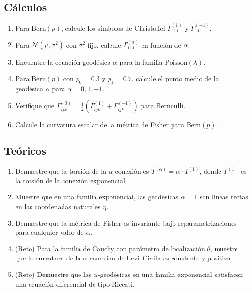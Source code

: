 \subsection*{Cálculos}
\begin{enumerate}[resume]
	\item[$\star\star$] Para $\mathrm{Bern}(p)$, calcule los símbolos de Christoffel $\Gamma^{(1)}_{111}$ y $\Gamma^{(-1)}_{111}$.
	\item[$\star\star$] Para $\mathcal{N}(\mu, \sigma^2)$ con $\sigma^2$ fijo, calcule $\Gamma^{(\alpha)}_{111}$ en función de $\alpha$.
	\item[$\star\star$] Encuentre la ecuación geodésica $\alpha$ para la familia $\mathrm{Poisson}(\lambda)$.
	\item[$\star\star$] Para $\mathrm{Bern}(p)$ con $p_0 = 0.3$ y $p_1 = 0.7$, calcule el punto medio de la geodésica $\alpha$ para $\alpha = 0, 1, -1$.
	\item[$\star\star$] Verifique que $\Gamma^{(0)}_{ijk} = \frac{1}{2}(\Gamma^{(1)}_{ijk} + \Gamma^{(-1)}_{ijk})$ para Bernoulli.
	\item[$\star\star$] Calcule la curvatura escalar de la métrica de Fisher para $\mathrm{Bern}(p)$.
\end{enumerate}

\subsection*{Teóricos}
\begin{enumerate}[resume]
	\item[$\star\star\star$] Demuestre que la torsión de la $\alpha$-conexión es $T^{(\alpha)} = \alpha \cdot T^{(1)}$, donde $T^{(1)}$ es la torsión de la conexión exponencial.
	\item[$\star\star\star$] Muestre que en una familia exponencial, las geodésicas $\alpha = 1$ son líneas rectas en las coordenadas naturales $\eta$.
	\item[$\star\star\star$] Demuestre que la métrica de Fisher es invariante bajo reparametrizaciones para cualquier valor de $\alpha$.
	\item[$\star\star\star\star$] (Reto) Para la familia de Cauchy con parámetro de localización $\theta$, muestre que la curvatura de la $\alpha$-conexión de Levi--Civita es constante y positiva.
	\item[$\star\star\star\star$] (Reto) Demuestre que las $\alpha$-geodésicas en una familia exponencial satisfacen una ecuación diferencial de tipo Riccati.
\end{enumerate}

